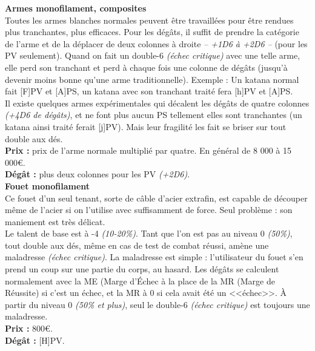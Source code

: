 \documentclass[11pt,twoside,a4paper]{article}
\begin{document}
\begin{multicols*}{2}
\textbf{Armes monofilament, composites}~\\
Toutes les armes blanches normales peuvent {\^e}tre travaill{\'e}es pour {\^e}tre rendues plus tranchantes, plus efficaces. Pour les d{\'e}g{\^a}ts, il suffit de prendre la cat{\'e}gorie de l'arme et de la d{\'e}placer de deux colonnes {\`a} droite \emph{-- +1D6 {\`a} +2D6 -- } (pour les PV seulement). Quand on fait un double-6 \emph{({\'e}chec critique)} avec une telle arme, elle perd son tranchant et perd {\`a} chaque fois une colonne de d{\'e}g{\^a}ts (jusqu'{\`a} devenir moins bonne qu'une arme traditionnelle). Exemple : Un katana normal fait [F]PV et [A]PS, un katana avec son tranchant trait{\'e} fera [h]PV et [A]PS. ~\\
Il existe quelques armes exp{\'e}rimentales qui d{\'e}calent les d{\'e}g{\^a}ts de quatre colonnes \emph{(+4D6 de d{\'e}g{\^a}ts)}, et ne font plus aucun PS tellement elles sont tranchantes (un katana ainsi trait{\'e} ferait [j]PV). Mais leur fragilit{\'e} les fait se briser sur tout double aux d{\'e}s. ~\\
\textbf{Prix : }prix de l'arme normale multipli{\'e} par quatre. En g{\'e}n{\'e}ral de 8 000 {\`a} 15 000\euro . ~\\
\textbf{D{\'e}g{\^a}t : }plus deux colonnes pour les PV \emph{(+2D6)}. ~\\

\textbf{Fouet monofilament}~\\
Ce fouet d'un seul tenant, sorte de c{\^a}ble d'acier extrafin, est capable de d{\'e}couper m{\^e}me de l'acier si on l'utilise avec suffisamment de force. Seul probl{\`e}me : son maniement est tr{\`e}s d{\'e}licat. ~\\
Le talent de base est {\`a} -4 \emph{(10-20\%)}. Tant que l'on est pas au niveau 0 \emph{(50\%)}, tout double aux d{\'e}s, m{\^e}me en cas de test de combat r{\'e}ussi, am{\`e}ne une maladresse \emph{({\'e}chec critique)}. La maladresse est simple : l'utilisateur du fouet s'en prend un coup sur une partie du corps, au hasard. Les d{\'e}g{\^a}ts se calculent normalement avec la ME (Marge d'{\'E}chec {\`a} la place de la MR (Marge de R{\'e}ussite) si c'est un {\'e}chec, et la MR {\`a} 0 si cela avait {\'e}t{\'e} un <<{\'e}chec>>. {\`A} partir du niveau 0 \emph{(50\% et plus)}, seul le double-6 \emph{({\'e}chec critique)} est toujours une maladresse. ~\\ 
\textbf{Prix : }800\euro . ~\\
\textbf{D{\'e}g{\^a}t : }[H]PV. ~\\


\end{multicols*}
\end{document}
